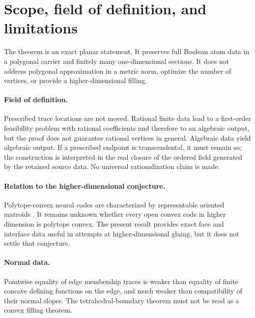 \section{Scope, field of definition, and limitations}\label{sec:limitations}

The theorem is an exact planar statement.  It preserves full Boolean atom
data in a polygonal carrier and finitely many one-dimensional sections.  It
does not address polygonal approximation in a metric norm, optimize the
number of vertices, or provide a higher-dimensional filling.

\paragraph{Field of definition.}
Prescribed trace locations are not moved.  Rational finite data lead to a
first-order feasibility problem with rational coefficients and therefore to
an algebraic output, but the proof does not guarantee rational vertices in
general.  Algebraic data yield algebraic output.  If a prescribed endpoint
is transcendental, it must remain so; the construction is interpreted in the
real closure of the ordered field generated by the retained source data.
No universal rationalization claim is made.

\paragraph{Relation to the higher-dimensional conjecture.}
Polytope-convex neural codes are characterized by representable oriented
matroids \citep{KuninLienkaemperRosen2023}.  It remains unknown whether every
open convex code in higher dimension is polytope convex.  The present result
provides exact face and interface data useful in attempts at higher-dimensional
gluing, but it does not settle that conjecture.

\paragraph{Normal data.}
Pointwise equality of edge membership traces is weaker than equality of
finite concave defining functions on the edge, and much weaker than
compatibility of their normal slopes.  The tetrahedral-boundary theorem must
not be read as a convex filling theorem.
